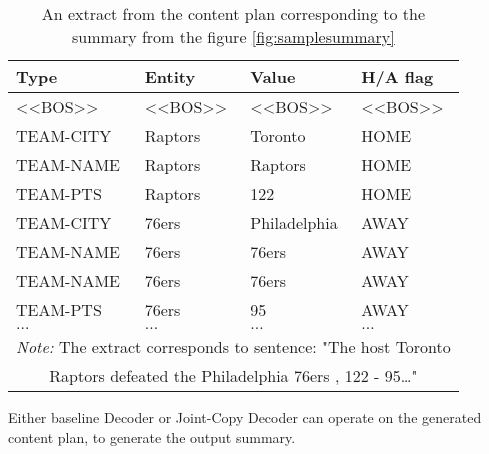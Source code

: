 \begin{table}[]
    \centering \small
    \begin{tabular}{llll}
        \toprule
        \textbf{Type} & \textbf{Entity} & \textbf{Value} & \textbf{H/A flag} \\                  
        \midrule
        \textless{}\textless{}BOS\textgreater{}\textgreater{} & \textless{}\textless{}BOS\textgreater{}\textgreater{} & \textless{}\textless{}BOS\textgreater{}\textgreater{} & \textless{}\textless{}BOS\textgreater{}\textgreater{} \\
        TEAM-CITY                                             & Raptors                                               & Toronto                                               & HOME                                                  \\
        TEAM-NAME                                             & Raptors                                               & Raptors                                               & HOME                                                  \\
        TEAM-PTS                                              & Raptors                                               & 122                                                   & HOME                                                  \\
        TEAM-CITY                                             & 76ers                                                 & Philadelphia                                          & AWAY                                                  \\
        TEAM-NAME                                             & 76ers                                                 & 76ers                                                 & AWAY                                                  \\
        TEAM-NAME                                             & 76ers                                                 & 76ers                                                 & AWAY                                                  \\
        TEAM-PTS                                              & 76ers                                                 & 95                                                    & AWAY                                                  \\
        $\dots$                                               & $\dots$                                               & $\dots$                                               & $\dots$ \\                                        
        \bottomrule
        \multicolumn{4}{c}{\footnotesize \textit{Note:} The extract corresponds to sentence: "The host Toronto} \\
        \multicolumn{4}{c}{\footnotesize Raptors defeated the Philadelphia 76ers , 122 - 95\dots "}
    \end{tabular}
    \caption{An extract from the content plan corresponding to the summary from the figure \ref{fig:samplesummary}}
\end{table}

Either baseline Decoder or Joint-Copy Decoder can operate on the generated content plan, to generate the output summary.